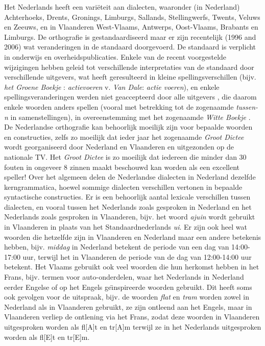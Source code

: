\documentclass[]{../../metanetpaper}
\begin{document}
\begin{multicols}{2}
    Het Nederlands heeft een vari{\"e}teit aan dialecten, waaronder (in Nederland) Achterhoeks, Drents, Gronings, Limburgs, Sallands, Stellingwerfs, Twents, Veluws en Zeeuws, en in Vlaanderen West-Vlaams, Antwerps, Oost-Vlaams, Brabants en Limburgs. De orthografie is gestandaardiseerd maar er zijn recentelijk (1996 and 2006) wat veranderingen in de standaard doorgevoerd. De standaard is verplicht in onderwijs en overheidspublicaties. Enkele van de recent voorgestelde wijzigingen hebben geleid tot verschillende interpretaties van de standaard door verschillende uitgevers, wat heeft geresulteerd in kleine spellingsverschillen (bijv. \emph{het Groene Boekje} \cite{GroeneBoekje}: \emph{actievoeren} v. \emph{Van Dale}: \emph{actie voeren}), en enkele spellingsveranderingen werden niet geaccepteerd door alle uitgevers \cite{Wittespellers} , die daarom enkele woorden anders spellen (vooral met betrekking tot de zogenaamde \emph{tussen-n} in samenstellingen), in overeenstemming met het zogenaamde \emph{Witte Boekje} \cite{Wittespelling}.  De Nederlandse orthografie kan behoorlijk moeilijk zijn voor bepaalde woorden en constructies, zelfs zo moeilijk dat ieder jaar het zogenaamde \emph{Groot Dictee} \cite{Grootdictee} wordt georganiseerd door Nederland en Vlaanderen en uitgezonden op de nationale TV. Het \emph{Groot Dictee} is zo moeilijk dat iedereen die minder dan 30 fouten in ongeveer 8 zinnen maakt beschouwd kan worden als een excellent speller! Over het algemeen delen de Nederlandse dialecten in Nederland dezelfde kerngrammatica, hoewel sommige dialecten verschillen vertonen in bepaalde syntactische constructies. Er is een behoorlijk aantal lexicale verschillen tussen dialecten, en vooral tussen het Nederlands zoals gesproken in Nederland en het Nederlands zoals gesproken in Vlaanderen, bijv. het woord \emph{ajuin} wordt gebruikt in Vlaanderen in plaats van het Standaardnederlands \emph{ui}. Er zijn ook heel wat woorden die hetzelfde zijn in Vlaanderen en Nederland maar een andere betekenis hebben, bijv. \emph{middag} in Nederland betekent de periode van een dag van 14:00-17:00 uur, terwijl het in Vlaanderen de periode van de dag van 12:00-14:00 uur betekent. Het Vlaams gebruikt ook veel woorden die hun herkomst hebben in het Frans, bijv. termen voor auto-onderdelen, waar het Nederlands in Nederland eerder Engelse of op het Engels ge{\"\i}nspireerde woorden gebruikt. Dit heeft soms ook gevolgen voor de uitspraak, bijv. de woorden \emph{flat} en \emph{tram} worden zowel in Nederland als in Vlaanderen gebruikt, ze zijn ontleend aan het Engels, maar in Vlaanderen verliep de ontlening via het Frans, zodat deze woorden in Vlaanderen uitgesproken worden als fl[A]t en tr[A]m terwijl ze in het Nederlands uitgesproken worden als fl[E]t en tr[E]m.


\end{multicols}
\end{document}
